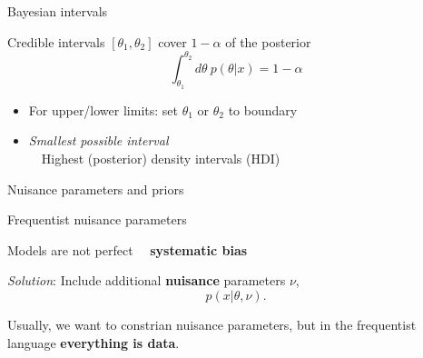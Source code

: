 \documentclass[
aspectratio=169,
14pt,
professionalfonts
]{beamer}
\newcommand{\arrow}{~\ding{220}~}
\begin{document}
\begin{frame}{Bayesian intervals}

Credible intervals $[\theta_1, \theta_2]$ cover $1-\alpha$ of the posterior
$$
\int_{\theta_1}^{\theta_2} d\theta ~ p(\theta| x) = 1-\alpha
$$
\begin{itemize}
    \item For upper/lower limits: set $\theta_1$ or $\theta_2$ to boundary
    \item \textit{Smallest possible interval}\\
        \arrow Highest (posterior) density intervals (HDI)
\end{itemize}
\end{frame}


\begin{frame}
    \center
    \Large
    Nuisance parameters and priors
    \end{frame}
    
    \begin{frame}{Frequentist nuisance parameters}
    
    Models are not perfect \arrow \textbf{systematic bias}
    
    \textit{Solution}: Include additional \textbf{nuisance} parameters $\nu$,
    $$p(x|\theta, \nu).$$
    
    Usually, we want to constrian nuisance parameters, but in the frequentist language \textbf{everything is data}.
    
    \end{frame}
    
    
\end{document}
